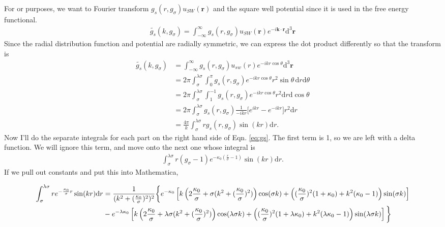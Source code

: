 \documentclass[letterpaper,twocolumn,amsmath,amssymb,pre,aps,10pt]{revtex4-1}
\newcommand\kk{\mathbf{k}}
\newcommand\rr{\mathbf{r}}
\begin{document}
For or purposes, we want to Fourier transform $g_s(r,g_\sigma)u_{SW}(\rr)$ and
the square well potential since it is used in the free energy functional.
\begin{align}
  \tilde{g_s}(k, g_\sigma) =\int^\infty_{-\infty} g_s(r, g_\sigma)u_{SW}(\rr)e^{-i\kk \cdot \rr}\mathrm{d}^3\rr
\end{align}
Since the radial distribution function and potential are radially symmetric, we can
express the dot product differently so that the transform is
\begin{align}
  \tilde{g_s}(k, g_\sigma) &=\int^\infty_{-\infty} g_s(r,
  g_\sigma)u_{sw}(r)e^{-ikr \cos \theta}\mathrm{d}^3\rr \\
  &= 2 \pi \int_\sigma^{\lambda \sigma} \int_0^\pi g_s(r, g_\sigma) e^{-ikr \cos
    \theta} r^2 \sin \theta \, \mathrm{d}r \mathrm{d}\theta \\
  &= 2\pi\int_\sigma^{\lambda \sigma} \int_{1}^{-1} g_s(r, g_\sigma) e^{-ikr \cos
    \theta} r^2 \mathrm{d}r \mathrm{d}\cos \theta \\
  &= 2\pi\int_\sigma^{\lambda \sigma} g_s(r, g_\sigma) \frac{1}{-ikr}\bigg[e^{ikr} -
    e^{-ikr} \bigg]r^2 \mathrm{d}r \\
 &= \frac {4\pi}{k}\int_\sigma^{\lambda \sigma} r g_s(r,g_\sigma) \sin (kr) \mathrm{d}r.
\end{align}
Now I'll do the separate integrals for each part on the right hand
side of Eqn. \ref{eq:gs}. The first term is 1, so we are left with
a delta function.  We will ignore this term, and
move onto the next one whose integral is
\begin{align}
  \int_\sigma^{\lambda \sigma}r(g_\sigma -1) e^{-\kappa_0
    \left( \frac{r}{\sigma}-1 \right)} \sin(kr)\mathrm{d}r.
\end{align}
If we pull out constants and put this into Mathematica,
\begin{widetext}
  \begin{align}
  \int_\sigma^{\lambda
    \sigma}re^{-\frac{\kappa_0}{\sigma}r}\sin(kr)\mathrm{d}r
  &= \frac{1}{(k^2 + (\frac{\kappa_{0}}{\sigma})^2)^2} \bigg\{ e^{-\kappa_0} \left[k
      \left(2\frac{\kappa_{0}}{\sigma} + \sigma (k^2 + (\frac{\kappa_{0}}{\sigma})^2) \right)
      \cos (\sigma k) + \left((\frac{\kappa_{0}}{\sigma})^2(1 + \kappa_0) +
      k^2(\kappa_0-1)\right) \sin (\sigma k) \right] \notag \\
  &- e^{-\lambda
    \kappa_0} \left[ k
      \left(2\frac{\kappa_{0}}{\sigma} + \lambda \sigma (k^2 + (\frac{\kappa_{0}}{\sigma})^2) \right)
      \cos (\lambda \sigma k) + \left((\frac{\kappa_{0}}{\sigma})^2(1 + \lambda \kappa_0) +
      k^2(\lambda\kappa_0-1)\right) \sin (\lambda \sigma k)\right] \bigg\}
  \end{align}
\end{widetext}
\end{document}
